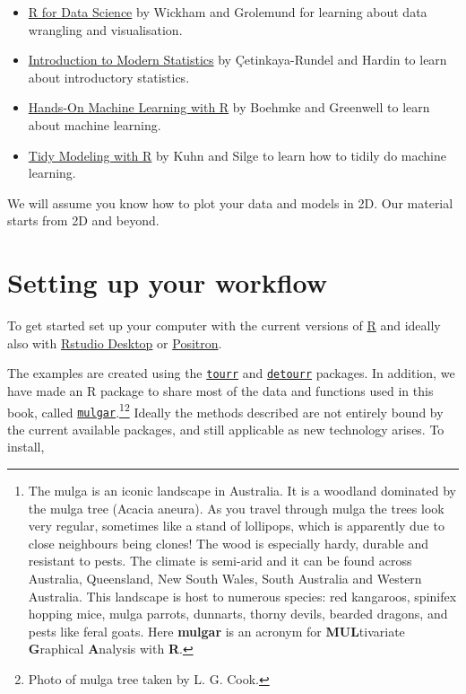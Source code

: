 \documentclass[
  letterpaper,
]{krantz}
\providecommand{\tightlist}{%
  \setlength{\itemsep}{0pt}\setlength{\parskip}{0pt}}
\begin{document}
\begin{itemize}
\tightlist
\item
  \href{https://r4ds.had.co.nz}{R for Data Science} by Wickham and
  Grolemund for learning about data wrangling and visualisation.
\item
  \href{https://openintro-ims.netlify.app}{Introduction to Modern
  Statistics} by Çetinkaya-Rundel and Hardin to learn about introductory
  statistics.
\item
  \href{https://bradleyboehmke.github.io/HOML/}{Hands-On Machine
  Learning with R} by Boehmke and Greenwell to learn about machine
  learning.
\item
  \href{https://www.tmwr.org}{Tidy Modeling with R} by Kuhn and Silge to
  learn how to tidily do machine learning.
\end{itemize}

We will assume you know how to plot your data and models in 2D. Our
material starts from 2D and beyond.

\section*{Setting up your workflow}\label{setting-up-your-workflow}


To get started set up your computer with the current versions of
\href{https://cran.r-project.org}{R} and ideally also with
\href{https://posit.co/download/rstudio-desktop/}{Rstudio Desktop} or
\href{https://positron.posit.co}{Positron}.

The examples are created using the
\href{http://ggobi.github.io/tourr/}{\texttt{tourr}} and
\href{https://casperhart.github.io/detourr/}{\texttt{detourr}} packages.
In addition, we have made an R package to share most of the data and
functions used in this book, called
\href{http://dicook.github.io/mulgar}{\texttt{mulgar}}.\footnote{The
  mulga is an iconic landscape in Australia. It is a woodland dominated
  by the mulga tree (Acacia aneura). As you travel through mulga the
  trees look very regular, sometimes like a stand of lollipops, which is
  apparently due to close neighbours being clones! The wood is
  especially hardy, durable and resistant to pests. The climate is
  semi-arid and it can be found across Australia, Queensland, New South
  Wales, South Australia and Western Australia. This landscape is host
  to numerous species: red kangaroos, spinifex hopping mice, mulga
  parrots, dunnarts, thorny devils, bearded dragons, and pests like
  feral goats. Here \textbf{mulgar} is an acronym for
  \textbf{MUL}tivariate \textbf{G}raphical \textbf{A}nalysis with
  \textbf{R}.}\footnote{Photo of mulga tree taken by L. G. Cook.}
Ideally the methods described are not entirely bound by the current
available packages, and still applicable as new technology arises. To
install,
\end{document}
